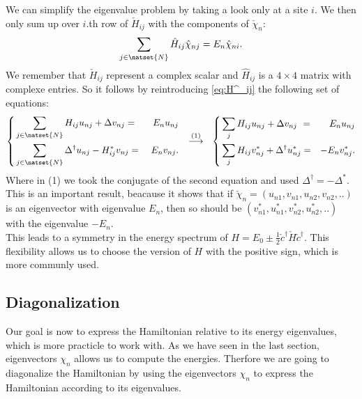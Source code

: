 \documentclass[../main.tex]{subfile}
\begin{document}
We can simplify the eigenvalue problem by taking a look only at a site $i$. We then only sum up over $i$.th row of $\check{H}_{ij}$ with the components of $\check{\chi}_n$:
\[
    \sum_{j\in\natset{N}}\hat{H}_{ij} \hat{\chi}_{nj} = E_n \hat{\chi}_{ni}.
\]
We remember that $\check{H}_{ij}$ represent a complex scalar and $\hat{H}_{ij}$ is a $4\times4$ matrix with complexe entries. So it follows by reintroducing \ref{eq:H^_ij} the following set of equations:
\begin{equation}
    \left\{
    \begin{aligned}
        &\sum_{j\in\natset{N}}H_{ij} u_{nj} + \Delta v_{nj} = &E_n u_{nj}\\
        &\sum_{j\in\natset{N}}\Delta^{\dagger} u_{nj} - H_{ij}^{\ast} v_{nj} =~& E_n v_{nj}.
    \end{aligned}
    \right.~~
    \stackrel{(1)}{\longrightarrow}~~
    \left\{
        \begin{aligned}
            &\sum_{j} H_{ij} u_{nj} + \Delta v_{nj} ~=& E_n u_{nj}\\
            &\sum_{j} H_{ij} v_{nj}^{\ast} + \Delta^{\dagger} u_{nj}^{\ast}= &-E_n v_{nj}^{\ast}.
        \end{aligned}
        \right.
\end{equation}
Where in (1) we took the conjugate of the second equation and used $\Delta^{\dagger} = -\Delta^{\ast}$.
This is an important result, beacause it shows that if $\check{\chi}_n = (u_{n1}, v_{n1},u_{n2}, v_{n2},.. )$ 
is an eigenvector with eigenvalue $E_n$, then  
so should be $(v_{n1}^{\ast}, u_{n1}^{\ast},v_{n2}^{\ast}, u_{n2}^{\ast},.. )$ with the eigenvalue $-E_n$.\\

This leads to a symmetry in the energy spectrum of $H = E_0 \pm \frac{1}{2}\check{c}^{\dagger}\check{H}\check{c}^{\dagger}$.
This flexibility allows us to choose the version of $H$ with the positive sign, which is more communly used.\\

\subsection{Diagonalization}
Our goal is now to express the Hamiltonian relative to its energy eigenvalues, which is more practicle to work with.
As we have seen in the last section, eigenvectors $\chi_n$ allows us to compute the energies. Therfore we are going 
to diagonalize the Hamiltonian by using the eigenvectors $\chi_n$ to express the Hamiltonian according to its eigenvalues.\\
\end{document}
